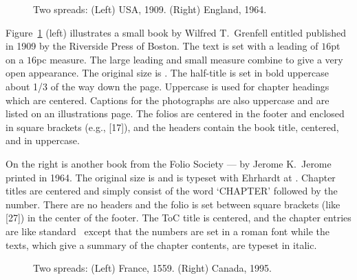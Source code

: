 \documentclass[10pt,a4paper,oneside,extrafontsizes]{memoir}%
\begin{document}
\begin{figure}
\centering
\begin{minipage}[b]{\pwlayi}
\end{minipage}
\hfill
\begin{minipage}[b]{\pwlayi}
\end{minipage}
\caption[Two spreads: USA, 1909 and England, 1964.]%
        {Two spreads: (Left) USA, 1909.
         (Right) England, 1964.} \label{fb:2}
\end{figure}

\begin{paracol}{2}
\switchEng
    Figure~\ref{fb:2} (left) illustrates a small book by Wilfred T.~Grenfell
entitled  published in 1909 by the Riverside
Press of Boston. The text is set with a leading 
of $16$pt on a $16$pc 
measure. The large leading and small measure combine to give a very 
open appearance. The original size is . 
 The half-title is set in 
bold uppercase about 1/3
of the way down the page. Uppercase is used for chapter
headings which are centered. Captions for the photographs
are also uppercase and are listed on an illustrations page. 
The folios are
centered in the footer and enclosed in square 
brackets (e.g., [17]), and the
headers contain the book title, centered, 
and in uppercase.



On the right is another book from the
Folio Society ---  
by Jerome K.~Jerome printed
in 1964. The original size is  and is typeset with
Ehrhardt at . 
Chapter titles are
centered and simply consist of  the word `CHAPTER' followed by the number.
There are no headers and the folio 
is set between square brackets (like [27])
in the center of the footer. The ToC
title is centered, and the chapter entries are like standard \ltx\ except
that the numbers are set in a roman font while the texts, which give a 
summary of the chapter contents, are typeset in italic.
\end{paracol}

\begin{figure}
\centering
\begin{minipage}[b]{\pwlayi}
\end{minipage}
\hfill
\begin{minipage}[b]{\pwlayi}
\end{minipage}
\caption[Two spreads: France, 1559 and Canada, 1995]%
        {Two spreads: (Left) France, 1559.
         (Right) Canada, 1995.} \label{fb:3}
\end{figure}
\end{document}
